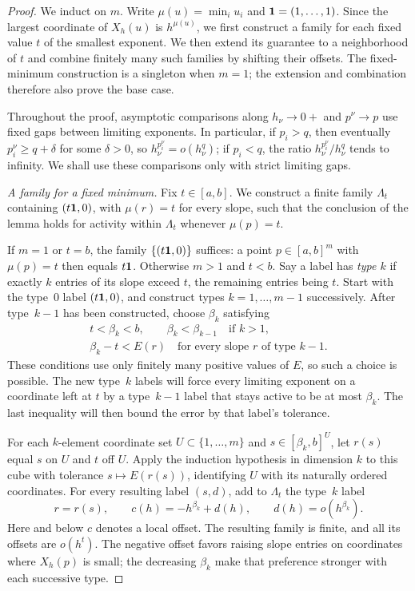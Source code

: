 \begin{proof}
We induct on $m$. Write $\mu(u)=\min_i u_i$ and
$\mathbf 1=(1,\ldots,1)$. Since the largest coordinate of $X_h(u)$ is
$h^{\mu(u)}$, we first construct a family for each fixed value $t$ of
the smallest exponent. We then extend its guarantee to a neighborhood
of $t$ and combine finitely many such families by shifting their offsets.
The fixed-minimum construction is a singleton when $m=1$; the extension
and combination therefore also prove the base case.

Throughout the proof, asymptotic comparisons along $h_\nu\to0+$ and
$p^\nu\to p$ use fixed gaps between limiting exponents. In particular,
if $p_i>q$, then eventually $p_i^\nu\geq q+\delta$ for some
$\delta>0$, so $h_\nu^{p_i^\nu}=o(h_\nu^q)$; if $p_i<q$, the ratio
$h_\nu^{p_i^\nu}/h_\nu^q$ tends to infinity. We shall use these
comparisons only with strict limiting gaps.

\medskip
\noindent\emph{A family for a fixed minimum.}
Fix $t\in[a,b]$. We construct a finite family $\Lambda_t$ containing
$(t\mathbf 1,0)$, with $\mu(r)=t$ for every slope, such that the conclusion
of the lemma holds for activity within $\Lambda_t$ whenever
$\mu(p)=t$.

If $m=1$ or $t=b$, the family $\{(t\mathbf 1,0)\}$ suffices: a point
$p\in[a,b]^m$ with $\mu(p)=t$ then equals $t\mathbf 1$. Otherwise
$m>1$ and $t<b$. Say a label has \emph{type $k$} if exactly $k$
entries of its slope exceed $t$, the remaining entries being $t$.
Start with the type~$0$ label $(t\mathbf 1,0)$, and construct types
$k=1,\ldots,m-1$ successively. After type~$k-1$ has been constructed,
choose $\beta_k$ satisfying
\begin{gather*}
 t<\beta_k<b,\qquad
 \beta_k<\beta_{k-1}\quad\text{if }k>1,\\
 \beta_k-t<E(r)
 \quad\text{for every slope $r$ of type $k-1$.}
\end{gather*}
These conditions use only finitely many positive values of $E$, so
such a choice is possible. The new type~$k$ labels will force every
limiting exponent on a coordinate left at $t$ by a type~$k-1$ label
that stays active to be at most $\beta_k$. The last inequality will
then bound the error by that label's tolerance.

For each $k$-element coordinate set $U\subset\{1,\ldots,m\}$ and
$s\in[\beta_k,b]^U$, let $r(s)$ equal $s$ on $U$ and $t$ off $U$.
Apply the induction hypothesis in dimension $k$ to this cube with
tolerance $s\mapsto E(r(s))$, identifying $U$ with its naturally ordered
coordinates. For every resulting label $(s,d)$, add to $\Lambda_t$ the
type~$k$ label
\begin{equation}
 r=r(s),\qquad c(h)=-h^{\beta_k}+d(h),
 \qquad d(h)=o(h^{\beta_k}).
 \label{eq:local-labels}
\end{equation}
Here and below $c$ denotes a local offset. The resulting family is finite,
and all its offsets are $o(h^t)$. The negative offset favors raising
slope entries on coordinates where $X_h(p)$ is small; the decreasing
$\beta_k$ make that preference stronger with each successive type.


\end{proof}
